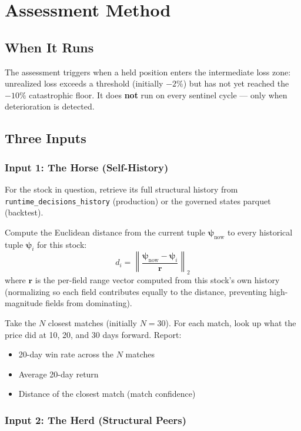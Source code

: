 \documentclass[11pt, a4paper]{article}
\begin{document}
\section{Assessment Method}

\subsection{When It Runs}

The assessment triggers when a held position enters the intermediate loss
zone: unrealized loss exceeds a threshold (initially $-2\%$) but has not
yet reached the $-10\%$ catastrophic floor. It does \textbf{not} run on
every sentinel cycle --- only when deterioration is detected.

\subsection{Three Inputs}

\subsubsection{Input 1: The Horse (Self-History)}

For the stock in question, retrieve its full structural history from
\texttt{runtime\_decisions\_history} (production) or the governed states
parquet (backtest).

Compute the Euclidean distance from the current tuple $\boldsymbol{\psi}_{\text{now}}$
to every historical tuple $\boldsymbol{\psi}_i$ for this stock:
\[
  d_i = \left\| \frac{\boldsymbol{\psi}_{\text{now}} - \boldsymbol{\psi}_i}
  {\boldsymbol{r}} \right\|_2
\]
where $\boldsymbol{r}$ is the per-field range vector computed from this
stock's own history (normalizing so each field contributes equally to the
distance, preventing high-magnitude fields from dominating).

Take the $N$ closest matches (initially $N = 30$). For each match, look up
what the price did at 10, 20, and 30 days forward. Report:
\begin{itemize}
  \item 20-day win rate across the $N$ matches
  \item Average 20-day return
  \item Distance of the closest match (match confidence)
\end{itemize}

\subsubsection{Input 2: The Herd (Structural Peers)}
\end{document}
